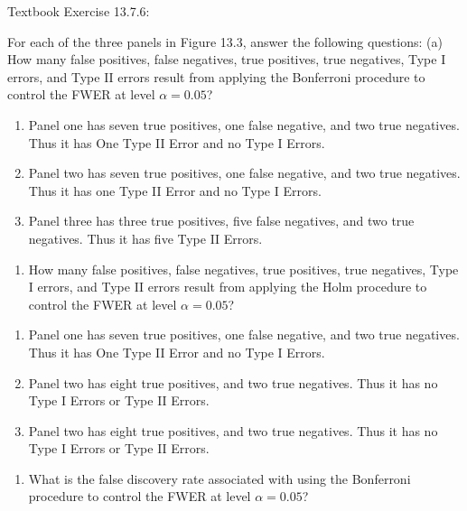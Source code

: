 \documentclass[
]{article}
\providecommand{\tightlist}{%
  \setlength{\itemsep}{0pt}\setlength{\parskip}{0pt}}
\begin{document}
Textbook Exercise 13.7.6:

For each of the three panels in Figure 13.3, answer the following
questions: (a) How many false positives, false negatives, true
positives, true negatives, Type I errors, and Type II errors result from
applying the Bonferroni procedure to control the FWER at level
\(\alpha = 0.05\)?

\begin{enumerate}
\def\labelenumi{\arabic{enumi}.}
\item
  Panel one has seven true positives, one false negative, and two true
  negatives. Thus it has One Type II Error and no Type I Errors.
\item
  Panel two has seven true positives, one false negative, and two true
  negatives. Thus it has one Type II Error and no Type I Errors.
\item
  Panel three has three true positives, five false negatives, and two
  true negatives. Thus it has five Type II Errors.
\end{enumerate}

\begin{enumerate}
\def\labelenumi{(\alph{enumi})}
\setcounter{enumi}{1}
\tightlist
\item
  How many false positives, false negatives, true positives, true
  negatives, Type I errors, and Type II errors result from applying the
  Holm procedure to control the FWER at level \(\alpha = 0.05\)?
\end{enumerate}

\begin{enumerate}
\def\labelenumi{\arabic{enumi}.}
\item
  Panel one has seven true positives, one false negative, and two true
  negatives. Thus it has One Type II Error and no Type I Errors.
\item
  Panel two has eight true positives, and two true negatives. Thus it
  has no Type I Errors or Type II Errors.
\item
  Panel two has eight true positives, and two true negatives. Thus it
  has no Type I Errors or Type II Errors.
\end{enumerate}

\begin{enumerate}
\def\labelenumi{(\alph{enumi})}
\setcounter{enumi}{2}
\tightlist
\item
  What is the false discovery rate associated with using the Bonferroni
  procedure to control the FWER at level \(\alpha = 0.05\)?
\end{enumerate}
\end{document}
